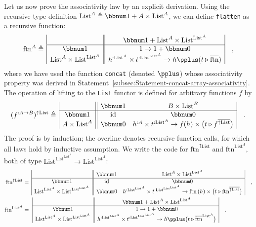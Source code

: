 Let us now prove the associativity law by an explicit derivation.
Using the recursive type definition $\text{List}^{A}\triangleq\bbnum 1+A\times\text{List}^{A}$,
we can define \lstinline!flatten! as a recursive function:
\[
\text{ftn}^{A}\triangleq\,\begin{array}{|c||c|}
 & \bbnum 1+\text{List}^{A}\times\text{List}^{\text{List}^{A}}\\
\hline \bbnum 1 & 1\rightarrow1+\bbnum 0\\
\text{List}^{A}\times\text{List}^{\text{List}^{A}} & h^{:\text{List}^{A}}\times t^{:\text{List}^{\text{List}^{A}}}\rightarrow h\pplus(t\triangleright\overline{\text{ftn}})
\end{array}\quad,
\]
where we have used the function \lstinline!concat! (denoted $\pplus$)
whose associativity property was derived in Statement~\ref{subsec:Statement-concat-array-associativity}.
The operation of lifting to the \lstinline!List! functor is defined
for arbitrary functions $f$ by
\[
(f^{:A\rightarrow B})^{\uparrow\text{List}}\triangleq\,\begin{array}{|c||cc|}
 & \bbnum 1 & B\times\text{List}^{B}\\
\hline \bbnum 1 & \text{id} & \bbnum 0\\
A\times\text{List}^{A} & \bbnum 0 & h^{:A}\times t^{:\text{List}^{A}}\rightarrow f(h)\times\big(t\triangleright f^{\overline{\uparrow\text{List}}}\big)
\end{array}\quad.
\]
The proof is by induction; the overline denotes recursive function
calls, for which all laws hold by inductive assumption. We write the
code for $\text{ftn}^{\uparrow\text{List}}$ and $\text{ftn}^{\text{List}^{A}}$,
both of type $\text{List}^{\text{List}^{\text{List}^{A}}}\rightarrow\text{List}^{\text{List}^{A}}$:
\begin{align*}
\text{ftn}^{\uparrow\text{List}} & =\,\begin{array}{|c||cc|}
 & \bbnum 1 & \text{List}^{A}\times\text{List}^{\text{List}^{A}}\\
\hline \bbnum 1 & \text{id} & \bbnum 0\\
\text{List}^{\text{List}^{A}}\times\text{List}^{\text{List}^{\text{List}^{A}}} & \bbnum 0 & h^{:\text{List}^{\text{List}^{A}}}\times t^{:\text{List}^{\text{List}^{\text{List}^{A}}}}\rightarrow\text{ftn}\,(h)\times\big(t\triangleright\text{ftn}^{\overline{\uparrow\text{List}}}\big)
\end{array}\quad,\\
\text{ftn}^{\text{List}^{A}} & =\,\,\begin{array}{|c||c|}
 & \bbnum 1+\text{List}^{A}\times\text{List}^{\text{List}^{A}}\\
\hline \bbnum 1 & 1\rightarrow1+\bbnum 0\\
\text{List}^{\text{List}^{A}}\times\text{List}^{\text{List}^{\text{List}^{A}}} & h^{:\text{List}^{\text{List}^{A}}}\times t^{:\text{List}^{\text{List}^{\text{List}^{A}}}}\rightarrow h\pplus\big(t\triangleright\overline{\text{ftn}}^{\text{List}^{A}}\big)
\end{array}\quad.
\end{align*}
